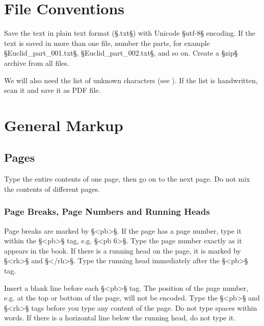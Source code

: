 



\section{File Conventions}
\label{section file conventions}

\begin{mainruleLessImportant}
Save the text in plain text format (§.txt§) with Unicode §utf-8§ encoding. If the text is saved in more than one file, number the parts, for example §Euclid_part_001.txt§, §Euclid_part_002.txt§, and so on. Create a §zip§ archive from all files.

We will also need the list of unknown characters (see ). If the list is handwritten, scan it and save it as PDF file. 
\end{mainruleLessImportant}


\section{General Markup}

\tocspace
\subsection{Pages}

\begin{mainrule}
Type the entire contents of one page, then go on to the next page. Do not mix the contents of different pages.
\end{mainrule}

\subsubsection{Page Breaks, Page Numbers and Running Heads}
\label{section page breaks}

\begin{mainrule}
Page breaks are marked by §<pb>§. If the page has a page number, type it within the §<pb>§ tag, e.g. §<pb 6>§. Type the page number exactly as it appears in the book. If there is a running head on the page, it is marked by §<rh>§ and §</rh>§. Type the running head immediately after the §<pb>§ tag. 
\end{mainrule}

\begin{clarification}
Insert a blank line before each §<pb>§ tag. 
The position of the page number, e.g. at the top or bottom of the page, will not be encoded. Type the §<pb>§ and §<rh>§ tags before you type any content of the page. Do not type spaces within words. If there is a horizontal line below the running head, do not type it.
\end{clarification}

